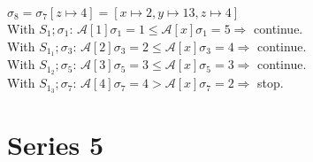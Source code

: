 \documentclass[12pt,fleqn]{article}		%
\begin{document}
\begin{enumerate}
\begin{enumerate}
$ \sigma_8 = \sigma_7[z \mapsto 4] = [x \mapsto 2, y \mapsto 13, z \mapsto 4] $\\
With $ S_1; \sigma_1 $: $ \mathcal{A}[1]\sigma_1 = 1 \leq \mathcal{A}[x]\sigma_1 = 5 \Rightarrow $ continue.\\
With $ S_{1_1}; \sigma_3 $: $ \mathcal{A}[2]\sigma_3 = 2 \leq \mathcal{A}[x]\sigma_3 = 4 \Rightarrow $ continue.\\
With $  S_{1_2}; \sigma_5 $: $ \mathcal{A}[3]\sigma_5 = 3 \leq \mathcal{A}[x]\sigma_5 = 3 \Rightarrow $ continue.\\
With $ S_{1_3}; \sigma_7 $: $ \mathcal{A}[4]\sigma_7 = 4 > \mathcal{A}[x]\sigma_7 = 2 \Rightarrow $ stop.\\
\end{enumerate}
\end{enumerate}

\section{Series 5}
\end{document}

